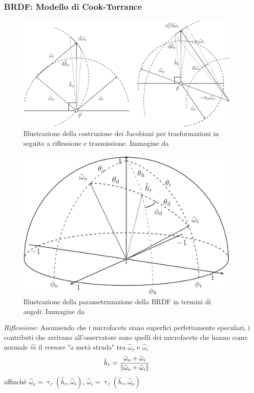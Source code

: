 \subsubsection{BRDF: Modello di Cook-Torrance}
\begin{figure}[t!]
	\centering
	\includegraphics[width=0.8\linewidth]{../assets/chapter3_surface_refl_jacobianPG.png}
	\caption{Illustrazione della costruzione dei Jacobiani per trasformazioni in seguito a riflessione e trasmissione. Immagine da \cite{pegoraro}}
	\label{chapter3:surface:reflJacobian}
\end{figure}
\begin{figure}[b!]
	\centering
	\includegraphics[width=0.5\linewidth]{../assets/chapter3_surface_BRDF_paramsPG.png}
	\caption{Illustrazione della parametrizzazione della BRDF in termini di angoli. Immagine da \cite{pegoraro}}
	\label{chapter3:surface:brdfParams}
\end{figure}
\textit{Riflessione}: Assumendo che i microfacets siano superfici perfettamente speculari, i contributi che arrivano all'osservatore sono quelli dei
microfacets che hanno come normale $\hat{m}$ il versore "a met\`a strada" tra $\hat{\omega}_o$ e $\hat{\omega}_i$ 
\begin{equation}
	\hat{h}_r = \frac{\hat{\omega}_o + \hat{\omega}_i}{\norm{\hat{\omega}_o + \hat{\omega}_i}}
\end{equation}
affinch\`e \mbox{$\hat{\omega}_o = \uptau_r(\hat{h}_r,\hat{\omega}_i)$}, \mbox{$\hat{\omega}_i = \uptau_r(\hat{h}_r,\hat{\omega}_o)$}\par
